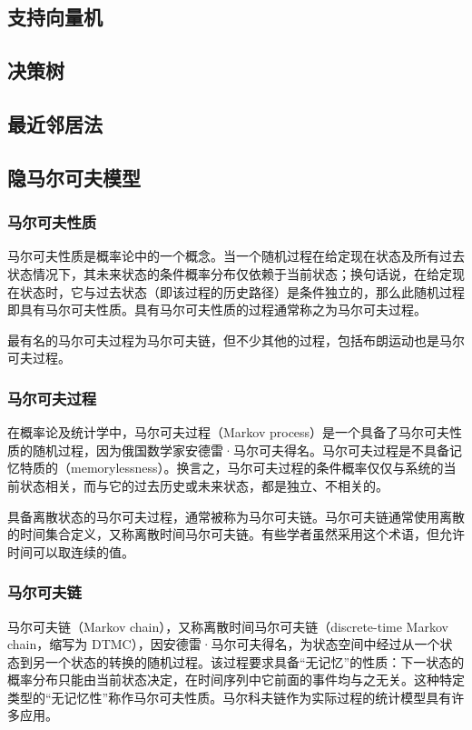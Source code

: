 \documentclass[11pt,a4paper,twoside]{book}
\begin{document}
\subsection{支持向量机}

\subsection{决策树}

\subsection{最近邻居法}

\subsection{隐马尔可夫模型}
\subsubsection{马尔可夫性质}
马尔可夫性质是概率论中的一个概念。当一个随机过程在给定现在状态及所有过去状态情况下，其未来状态的条件概率分布仅依赖于当前状态；换句话说，在给定现在状态时，它与过去状态（即该过程的历史路径）是条件独立的，那么此随机过程即具有马尔可夫性质。具有马尔可夫性质的过程通常称之为马尔可夫过程。

最有名的马尔可夫过程为马尔可夫链，但不少其他的过程，包括布朗运动也是马尔可夫过程。
\subsubsection{马尔可夫过程}
在概率论及统计学中，马尔可夫过程（Markov process）是一个具备了马尔可夫性质的随机过程，因为俄国数学家安德雷·马尔可夫得名。马尔可夫过程是不具备记忆特质的（memorylessness）。换言之，马尔可夫过程的条件概率仅仅与系统的当前状态相关，而与它的过去历史或未来状态，都是独立、不相关的。

具备离散状态的马尔可夫过程，通常被称为马尔可夫链。马尔可夫链通常使用离散的时间集合定义，又称离散时间马尔可夫链。有些学者虽然采用这个术语，但允许时间可以取连续的值。
\subsubsection{马尔可夫链}
马尔可夫链（Markov chain），又称离散时间马尔可夫链（discrete-time Markov chain，缩写为 DTMC），因安德雷·马尔可夫得名，为状态空间中经过从一个状态到另一个状态的转换的随机过程。该过程要求具备“无记忆”的性质：下一状态的概率分布只能由当前状态决定，在时间序列中它前面的事件均与之无关。这种特定类型的“无记忆性”称作马尔可夫性质。马尔科夫链作为实际过程的统计模型具有许多应用。
\end{document}
